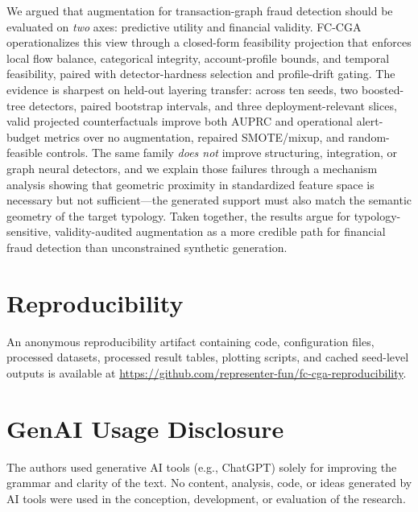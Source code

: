 \documentclass[sigconf,review,anonymous]{acmart}
\newcommand{\fcca}{\textsc{FC-CGA}\xspace}
\begin{document}
We argued that augmentation for transaction-graph fraud detection should be
evaluated on \emph{two} axes: predictive utility and financial validity.
\fcca operationalizes this view through a closed-form feasibility projection
that enforces local flow balance, categorical integrity, account-profile
bounds, and temporal feasibility, paired with detector-hardness selection and
profile-drift gating. The evidence is sharpest on held-out layering transfer:
across ten seeds, two boosted-tree detectors, paired bootstrap intervals, and
three deployment-relevant slices, valid projected counterfactuals improve
both AUPRC and operational alert-budget metrics over no augmentation,
repaired SMOTE/mixup, and random-feasible controls. The same family
\emph{does not} improve structuring, integration, or graph neural detectors,
and we explain those failures through a mechanism analysis showing that
geometric proximity in standardized feature space is necessary but not
sufficient---the generated support must also match the semantic geometry of
the target typology. Taken together, the results argue for
typology-sensitive, validity-audited augmentation as a more credible path
for financial fraud detection than unconstrained synthetic generation.

\section*{Reproducibility}
An anonymous reproducibility artifact containing code, configuration files,
processed datasets, processed result tables, plotting scripts, and cached
seed-level outputs is available at
\url{https://github.com/representer-fun/fc-cga-reproducibility}.

\section*{GenAI Usage Disclosure}
The authors used generative AI tools (e.g., ChatGPT) solely for improving the
grammar and clarity of the text. No content, analysis, code, or ideas
generated by AI tools were used in the conception, development, or evaluation
of the research.

\balance



\end{document}
